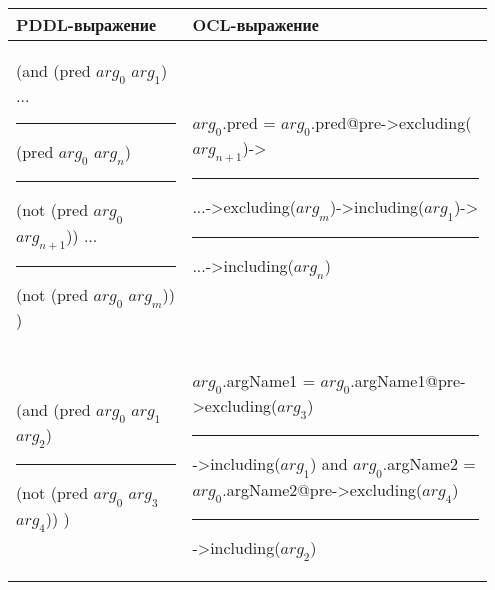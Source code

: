 {
    \renewcommand{\arraystretch}{1.3}
    \small
    \centering
    \begin{tabular}{|p{0.35\linewidth}|p{0.60\linewidth}|}
        \hline
        \normalfont \bfseries PDDL\:-выражение & \normalfont\bfseries OCL\:-выражение \\
        \hline
          (and (pred $arg_0$ $arg_1$) ... \newline 
          \rule{2em}{0em} (pred $arg_0$ $arg_n$) \newline
          \rule{2em}{0em} (not (pred $arg_0$ $arg_{n+1}$)) ... \newline
          \rule{2em}{0em} (not (pred $arg_0$ $arg_m$)) \newline 
          ) & 
          $arg_0$.pred = $arg_0$.pred@pre->excluding($arg_{n+1}$)->\newline
          \rule{2em}{0em} ...->excluding($arg_m$)->including($arg_1$)->\newline
          \rule{2em}{0em} ...->including($arg_n$)\\
        \hline
          (and (pred $arg_0$ $arg_1$ $arg_2$)\newline 
          \rule{2em}{0em} (not (pred $arg_0$ $arg_3$ $arg_4$))\newline
          ) &
          $arg_0$.argName1 = $arg_0$.argName1@pre->excluding($arg_3$) \newline
          \rule{2em}{0em} ->including($arg_1$) and \newline
          $arg_0$.argName2 = $arg_0$.argName2@pre->excluding($arg_4$) \newline
          \rule{2em}{0em} ->including($arg_2$) \\
        \hline

    \end{tabular}
}
\\[5pt]

